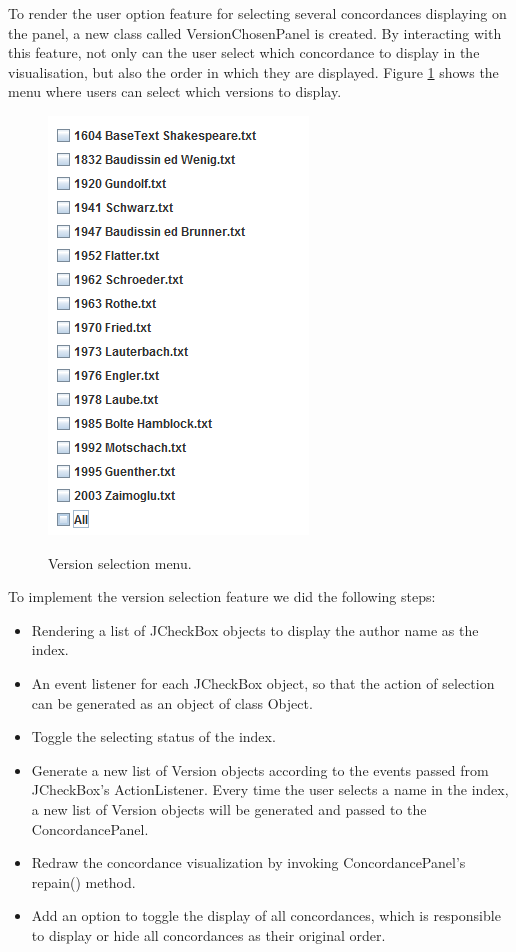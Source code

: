 To render the user option feature for selecting several concordances displaying on the panel, a new class called VersionChosenPanel is created. By interacting with this feature, not only can the user select which concordance to display in the visualisation, but also the order in which they are displayed. Figure
\ref{fig:versionChoosPanel} shows the menu where users can select which versions to display. 
\begin{figure}[H]
	\centering	
	\includegraphics[scale=0.5]{Figs/VersionChoosePanel}\\[1ex]
	\caption{Version selection menu.}
	\label{fig:versionChoosPanel}
\end{figure} 

To implement the version selection feature we did the following steps:
\begin{itemize}
	\item \textbf{} Rendering a list of JCheckBox objects to display the author name as the index. 
	\item \textbf{} An event listener for each JCheckBox object, so that the action of selection can be generated as an object of class Object.
	\item \textbf{} Toggle the selecting status of the index. 
	\item \textbf{} Generate a new list of Version objects according to the events passed from JCheckBox's ActionListener. Every time the user selects a name in the index, a new list of Version objects will be generated and passed to the ConcordancePanel. 
	\item \textbf{} Redraw the concordance visualization by invoking ConcordancePanel’s repain() method.
	\item \textbf{} Add an option to toggle the display of all concordances, which is responsible to display or hide all concordances as their original order.
\end{itemize}

